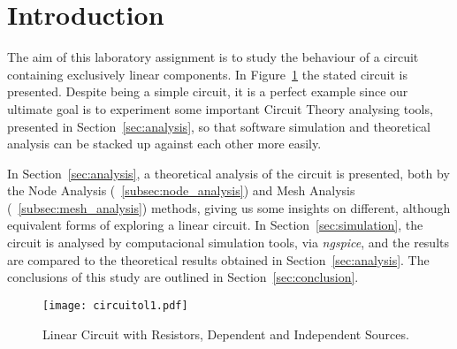 \section{Introduction}
\label{sec:introduction}

\indent The aim of this laboratory assignment is to study the behaviour of a circuit containing exclusively linear components. In Figure~\ref{fig:circuitol1} the stated circuit is presented. Despite being a simple circuit, it is a perfect example since our ultimate goal is to experiment some important Circuit Theory analysing tools, presented in Section~\ref{sec:analysis}, so that software simulation and theoretical analysis can be stacked up against each other more easily.

In Section~\ref{sec:analysis}, a theoretical analysis of the circuit is
presented, both by the Node Analysis (~\ref{subsec:node_analysis}) and Mesh Analysis (~\ref{subsec:mesh_analysis}) methods, giving us some insights on different, although equivalent forms of exploring a linear circuit. In Section~\ref{sec:simulation}, the circuit is analysed by computacional simulation tools, via \textit{ngspice}, and the results are compared to the theoretical results obtained in Section~\ref{sec:analysis}. The conclusions of this study are outlined in Section~\ref{sec:conclusion}.

\begin{figure}[h] \centering
\texttt{[image: circuitol1.pdf]}
\caption{Linear Circuit with Resistors, Dependent and Independent Sources.}
\label{fig:circuitol1}
\end{figure}

\clearpage
